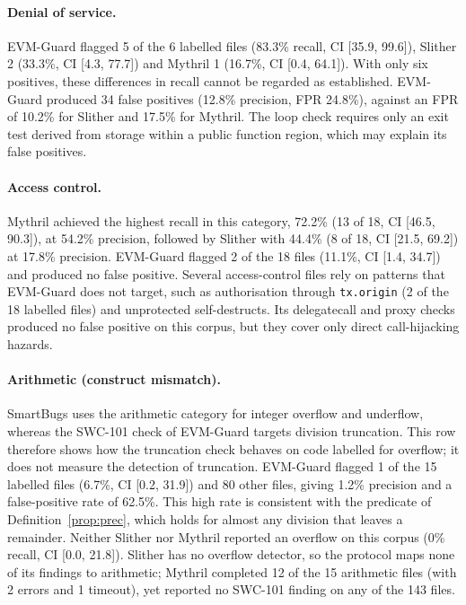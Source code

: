 \documentclass[pdflatex,sn-mathphys]{sn-jnl}
\theoremstyle{thmstyletwo}
\theoremstyle{thmstyletwo}
\begin{document}
\paragraph{Denial of service.} EVM-Guard flagged 5 of the 6 labelled files (83.3\% recall, CI [35.9, 99.6]), Slither 2 (33.3\%, CI [4.3, 77.7]) and Mythril 1 (16.7\%, CI [0.4, 64.1]). With only six positives, these differences in recall cannot be regarded as established. EVM-Guard produced 34 false positives (12.8\% precision, FPR 24.8\%), against an FPR of 10.2\% for Slither and 17.5\% for Mythril. The loop check requires only an exit test derived from storage within a public function region, which may explain its false positives.

\paragraph{Access control.} Mythril achieved the highest recall in this category, 72.2\% (13 of 18, CI [46.5, 90.3]), at 54.2\% precision, followed by Slither with 44.4\% (8 of 18, CI [21.5, 69.2]) at 17.8\% precision. EVM-Guard flagged 2 of the 18 files (11.1\%, CI [1.4, 34.7]) and produced no false positive. Several access-control files rely on patterns that EVM-Guard does not target, such as authorisation through \texttt{tx.origin} (2 of the 18 labelled files) and unprotected self-destructs. Its delegatecall and proxy checks produced no false positive on this corpus, but they cover only direct call-hijacking hazards.

\paragraph{Arithmetic (construct mismatch).}\label{sec:results:arith} SmartBugs uses the arithmetic category for integer overflow and underflow, whereas the SWC-101 check of EVM-Guard targets division truncation. This row therefore shows how the truncation check behaves on code labelled for overflow; it does not measure the detection of truncation. EVM-Guard flagged 1 of the 15 labelled files (6.7\%, CI [0.2, 31.9]) and 80 other files, giving 1.2\% precision and a false-positive rate of 62.5\%. This high rate is consistent with the predicate of Definition~\ref{prop:prec}, which holds for almost any division that leaves a remainder. Neither Slither nor Mythril reported an overflow on this corpus (0\% recall, CI [0.0, 21.8]). Slither has no overflow detector, so the protocol maps none of its findings to arithmetic; Mythril completed 12 of the 15 arithmetic files (with 2 errors and 1 timeout), yet reported no SWC-101 finding on any of the 143 files.
\end{document}
